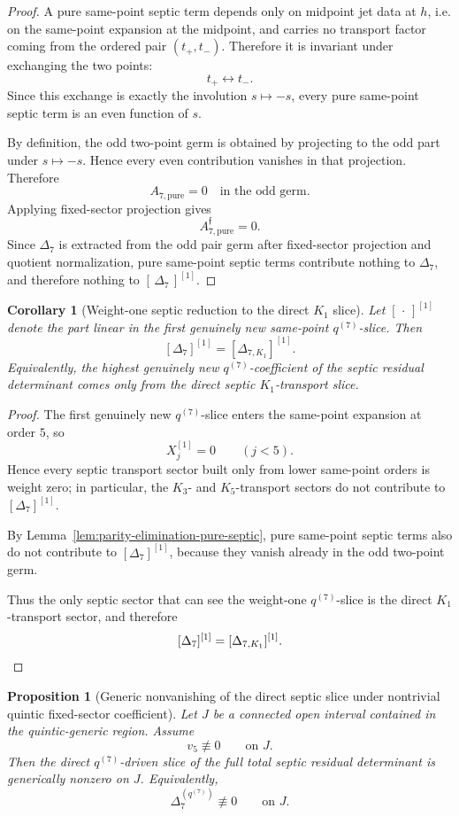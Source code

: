 \documentclass[11pt,a4paper]{amsart}
\theoremstyle{plain}
\newtheorem{proposition}[theorem]{Proposition}
\newtheorem{corollary}[theorem]{Corollary}
\theoremstyle{definition}
\begin{document}
\begin{proof}
A pure same-point septic term depends only on midpoint jet data at $h$, i.e.
on the same-point expansion at the midpoint, and carries no transport factor
coming from the ordered pair $(t_+,t_-)$. Therefore it is invariant under
exchanging the two points:
\[
t_+\leftrightarrow t_-.
\]
Since this exchange is exactly the involution $s\mapsto -s$, every pure
same-point septic term is an even function of $s$.

By definition, the odd two-point germ is obtained by projecting to the odd part
under $s\mapsto -s$. Hence every even contribution vanishes in that
projection. Therefore
\[
A_{7,\mathrm{pure}}=0
\quad\text{in the odd germ.}
\]
Applying fixed-sector projection gives
\[
A_{7,\mathrm{pure}}^{\mathfrak f}=0.
\]
Since $\Delta_7$ is extracted from the odd pair germ after fixed-sector
projection and quotient normalization, pure same-point septic terms contribute
nothing to $\Delta_7$, and therefore nothing to $[\,\Delta_7\,]^{[1]}$.
\end{proof}

\begin{corollary}[Weight-one septic reduction to the direct $K_1$ slice]
\label{cor:weight-one-septic-reduction}
Let $[\,\cdot\,]^{[1]}$ denote the part linear in the first genuinely new
same-point $q^{(7)}$-slice. Then
\[
[\Delta_7]^{[1]}=[\Delta_{7,K_1}]^{[1]}.
\]
Equivalently, the highest genuinely new $q^{(7)}$-coefficient of the septic
residual determinant comes only from the direct septic $K_1$-transport slice.
\end{corollary}

\begin{proof}
The first genuinely new $q^{(7)}$-slice enters the same-point expansion at
order $5$, so
\[
X_j^{[1]}=0
\qquad (j<5).
\]
Hence every septic transport sector built only from lower same-point orders is
weight zero; in particular, the $K_3$- and $K_5$-transport sectors do not
contribute to $[\Delta_7]^{[1]}$.

By Lemma~\ref{lem:parity-elimination-pure-septic}, pure same-point septic terms
also do not contribute to $[\Delta_7]^{[1]}$, because they vanish already in
the odd two-point germ.

Thus the only septic sector that can see the weight-one $q^{(7)}$-slice is
the direct $K_1$-transport sector, and therefore
\[
[\Delta_7]^{[1]}=[\Delta_{7,K_1}]^{[1]}.
\qedhere
\]
\end{proof}

\begin{proposition}[Generic nonvanishing of the direct septic slice under nontrivial quintic fixed-sector coefficient]
\label{prop:direct-q7-total-delta7-nonzero}
Let $J$ be a connected open interval contained in the quintic-generic region.
Assume
\[
v_5\not\equiv 0
\qquad\text{on }J.
\]
Then the direct $q^{(7)}$-driven slice of the full total septic residual
determinant is generically nonzero on $J$. Equivalently,
\[
\Delta_7^{(q^{(7)})}\not\equiv 0
\qquad\text{on }J.
\]
\end{proposition}
\end{document}
